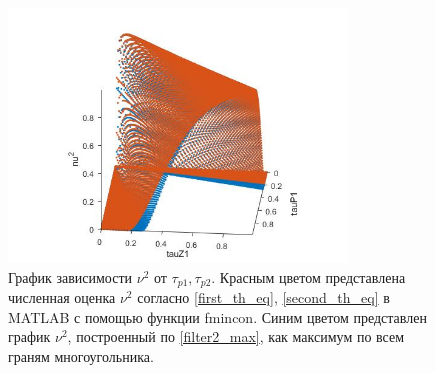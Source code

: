 \documentclass[a4paper,article,14pt]{extarticle}
\begin{document}
\begin{figure}[H]
\centering
\includegraphics[width=9cm]{images/filter2_agregated.jpg}
\caption{График зависимости $\nu^2$ от $\tau_{p1}, \tau_{p2}$. Красным цветом представлена численная оценка $\nu^2$ согласно \eqref{first_th_eq}, \eqref{second_th_eq} в MATLAB с помощью функции fmincon. Синим цветом представлен график $\nu^2$, построенный по \eqref{filter2_max}, как максимум по всем граням многоугольника.}
\end{figure}


\pagebreak
\end{document}

